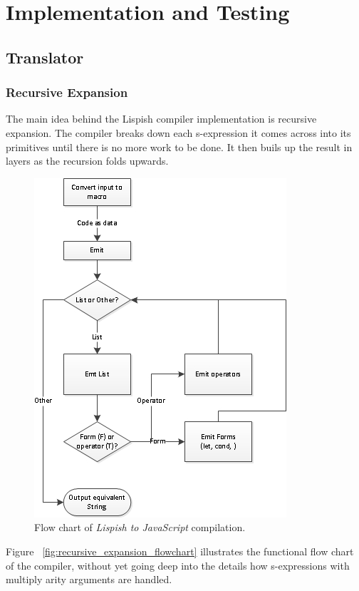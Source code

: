 \chapter{Implementation and Testing}

\section{Translator}

\subsection{Recursive Expansion}
The main idea behind the Lispish compiler implementation is recursive expansion.
The compiler breaks down each s-expression it comes across into its primitives until there is no more work to be done. It then buils up the result in layers as the recursion folds upwards. 

\begin{figure}[!htbp]
	\centering
	\includegraphics{Graphics/implementation_flowchart.jpg}
	\caption[yadayada]
   {Flow chart of \textit{Lispish to JavaScript} compilation.}
\end{figure}

Figure ~\ref{fig:recursive_expansion_flowchart} illustrates the functional flow chart of the compiler, without yet going deep into the details how s-expressions with multiply arity arguments are handled. 

